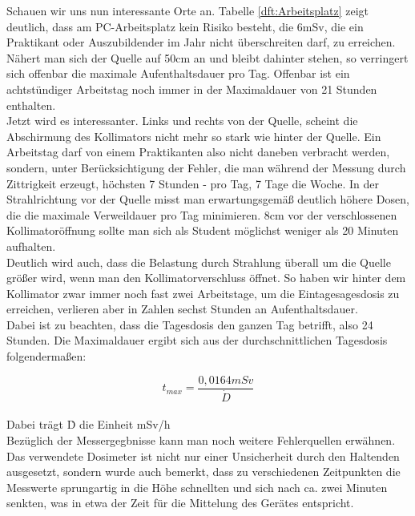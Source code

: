Schauen wir uns nun interessante Orte an. Tabelle \ref{dft:Arbeitsplatz} zeigt deutlich, dass am PC-Arbeitsplatz kein Risiko besteht, die 6mSv, die ein Praktikant oder Auszubildender im Jahr nicht überschreiten darf, zu erreichen. Nähert man sich der Quelle auf 50cm an und bleibt dahinter stehen, so verringert sich offenbar die maximale Aufenthaltsdauer pro Tag. Offenbar ist ein achtstündiger Arbeitstag noch immer in der Maximaldauer von 21 Stunden enthalten. \\
Jetzt wird es interessanter. Links und rechts von der Quelle, scheint die Abschirmung des Kollimators nicht mehr so stark wie hinter der Quelle. Ein Arbeitstag darf von einem Praktikanten also nicht daneben verbracht werden, sondern, unter Berücksichtigung der Fehler, die man während der Messung durch Zittrigkeit erzeugt, höchsten 7 Stunden - pro Tag, 7 Tage die Woche. 
In der Strahlrichtung vor der Quelle misst man erwartungsgemäß deutlich höhere Dosen, die die maximale Verweildauer pro Tag minimieren. 8cm vor der verschlossenen Kollimatoröffnung sollte man sich als Student möglichst weniger als 20 Minuten aufhalten.\\
Deutlich wird auch, dass die Belastung durch Strahlung überall um die Quelle größer wird, wenn man den Kollimatorverschluss öffnet. So haben wir hinter dem Kollimator zwar immer noch fast zwei Arbeitstage, um die Eintagesagesdosis zu erreichen, verlieren aber in Zahlen sechst Stunden an Aufenthaltsdauer. \\
Dabei ist zu beachten, dass die Tagesdosis den ganzen Tag betrifft, also 24 Stunden.
Die Maximaldauer ergibt sich aus der durchschnittlichen Tagesdosis folgendermaßen:

\begin{equation*}
    t_{max} = \frac{0,0164 mSv}{\dot D} 
\end{equation*}
\ \\
Dabei trägt \.D die Einheit mSv/h\\

Bezüglich der Messergegbnisse kann man noch weitere Fehlerquellen erwähnen. Das verwendete Dosimeter  ist nicht nur einer Unsicherheit durch den Haltenden ausgesetzt, sondern wurde auch bemerkt, dass zu verschiedenen Zeitpunkten die Messwerte sprungartig in die Höhe schnellten und sich nach ca. zwei Minuten senkten, was in etwa der Zeit für die Mittelung des Gerätes entspricht.

